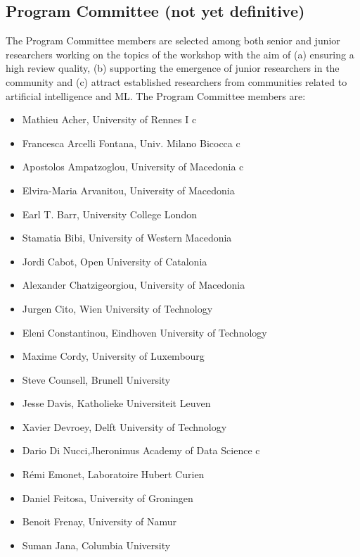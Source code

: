 \subsection{Program Committee (not yet definitive)}
The Program Committee members are selected among both senior and junior researchers working on the topics of the workshop with the aim of (a) ensuring a high review quality, (b) supporting the emergence of junior researchers in the community and (c) attract established researchers from communities related to artificial intelligence and ML. The Program Committee members are:
\begin{itemize}
	\item Mathieu Acher, University of Rennes I
c \smallskip
	\item Francesca Arcelli Fontana, Univ. Milano Bicocca c \smallskip
	\item Apostolos Ampatzoglou, University of Macedonia
c \smallskip
	\item Elvira-Maria Arvanitou, University of Macedonia
\smallskip
	\item Earl T. Barr, University College London
\smallskip
	\item Stamatia Bibi, University of Western Macedonia
\smallskip
	\item Jordi Cabot, Open University of Catalonia
\smallskip
	\item Alexander Chatzigeorgiou, University of Macedonia
\smallskip
	\item Jurgen Cito, Wien University of Technology
\smallskip
	\item Eleni Constantinou, Eindhoven University of Technology \smallskip
	\item Maxime Cordy, University of Luxembourg
\smallskip
	\item Steve Counsell, Brunell University
\smallskip
	\item Jesse Davis, Katholieke Universiteit Leuven
\smallskip
	\item Xavier Devroey, Delft University of Technology
\smallskip
	\item Dario Di Nucci,Jheronimus Academy of Data Science
c \smallskip
	\item Rémi Emonet, Laboratoire Hubert Curien
\smallskip
	\item Daniel Feitosa, University of Groningen
\smallskip
	\item Benoit Frenay, University of Namur
\smallskip
	\item Suman Jana, Columbia University

\end{itemize}

